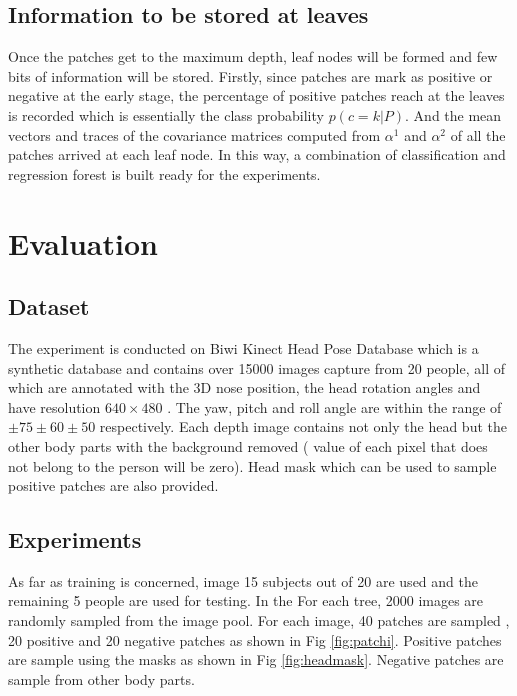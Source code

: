 \subsection{Information to be stored at leaves}
\label{subsec:leafdistribution}
Once the patches get to the maximum depth, leaf nodes will be formed and few bits of information will be stored. Firstly, since patches are mark as positive or negative at the early stage, the percentage of positive patches reach at the leaves is recorded which is essentially the class probability $p(c=k|P)$. And the mean vectors and traces of the covariance matrices computed from $\alpha ^{1}$  and $\alpha ^{2}$ of all the patches arrived at each leaf node. In this way, a combination of classification and regression forest is built ready for the experiments.

\clearpage
\newpage
\thispagestyle{plain}
\mbox{}
\section{Evaluation}
\label{sec:HPevaluation}

\subsection{Dataset}
\label{subsec:hpdataset}
The experiment is conducted on Biwi Kinect Head Pose Database which is a synthetic database and contains over 15000 images capture from 20 people, all of which are annotated with the 3D nose position, the head rotation angles and have resolution $640 \times 480$ . The yaw, pitch and roll angle are within the range of $\pm75 \pm60 \pm50 $ respectively. Each depth image contains not only the head but the other body parts with the background removed ( value of each pixel that does not belong to the person will be zero). Head mask which can be used to sample positive patches are also provided. \cite{GFRF} 

\subsection{Experiments}
\label{subsec:experiment}
As far as training is concerned, image 15 subjects out of 20 are used and the remaining 5 people are used for testing. In the For each tree, 2000 images are randomly sampled from the image pool. For each image, 40 patches are sampled , 20 positive and 20 negative patches as shown in Fig \ref{fig:patchi}. Positive patches are sample using the masks as shown in Fig \ref{fig:headmask}. Negative patches are sample from other  body parts. 

